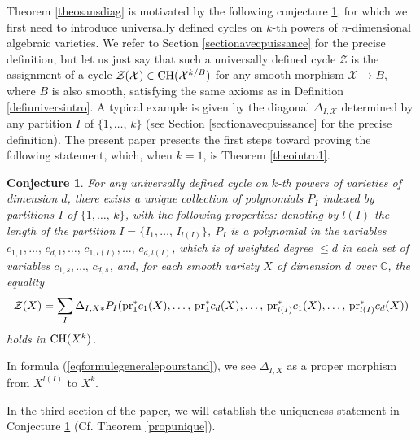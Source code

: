 \documentclass[10pt]{article}
\newtheorem{conj}[theo]{Conjecture}
\begin{document}
 Theorem \ref{theosansdiag} is motivated by the following conjecture \ref{theavecpowerintro}, for which
we first need  to introduce
universally defined cycles on $k$-th powers of $n$-dimensional algebraic varieties.
We refer to Section \ref{sectionavecpuissance} for the precise definition, but let us just say that such a universally defined
cycle
$\mathcal{Z}$  is the assignment
of a cycle $\mathcal{Z}(\mathcal{X})\in{\rm CH}(\mathcal{X}^{k/B})$ for any smooth morphism $\mathcal{X}\rightarrow B$, where
$B$ is also smooth, satisfying the same axioms as in Definition
\ref{defiuniversintro}.
A typical example is given by
the diagonal $\Delta_{I,\mathcal{X}}$ determined by any partition $I$ of
$\{1,\ldots,\,k\}$ (see Section \ref{sectionavecpuissance} for the precise definition).
The present paper presents the first steps toward proving  the following statement, which, when $k=1$,  is Theorem
\ref{theointro1}.
\begin{conj}\label{theavecpowerintro}  For any universally defined cycle on
$k$-th powers of varieties of dimension $d$, there exists a unique collection of polynomials
$P_I$ indexed by partitions $I$ of $\{1,\ldots,\,k\}$, with the following properties: denoting by  $l(I)$ the length of the partition $I=\{I_1,\ldots,\,I_{l(I)}\}$,
$P_I$ is a polynomial  in the variables
 $c_{1,1},\ldots,\,c_{d,1},\ldots,\,c_{1,l(I)},\ldots,\,c_{d,l(I)}$, which is of weighted degree $\leq d$ in each set
 of variables $c_{1,s},\ldots,\,c_{d,s}$, and,  for each smooth  variety
 $X$ of dimension $d$ over $\mathbb{C}$, the equality
 \begin{eqnarray} \label{eqformulegeneralepourstand} \mathcal{Z}(X)=\sum_I\Delta_{I,X*}P_I({\rm pr}_1^*c_{1}(X),\ldots,\,{\rm pr}_1^*c_{d}(X),\ldots,\,{\rm pr}_{l(I)}^*c_{1}(X),\ldots,\,{\rm pr}_{l(I)}^*c_{d}(X) )
 \end{eqnarray}
holds in ${\rm CH}(X^k)$.
\end{conj}
In formula (\ref{eqformulegeneralepourstand}), we see $\Delta_{I,X}$ as a proper morphism from
$X^{l(I)}$ to $X^k$.

In the third  section of the paper, we will  establish the uniqueness statement in  Conjecture  \ref{theavecpowerintro} (Cf. Theorem  \ref{propunique}).
\end{document}

